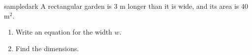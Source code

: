 \begin{scenariobox}{sampledark}
A rectangular garden is 3 m longer than it is wide, and its area is 40 m$^2$.
\begin{enumerate}
  \item Write an equation for the width $w$. \hfill \blank{4cm}
  \item Find the dimensions. \hfill \blank{4cm}
\end{enumerate}
\end{scenariobox}
